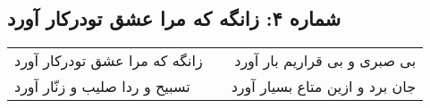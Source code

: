\begin{center}
\section*{شماره ۴: زانگه که مرا عشق تودرکار آورد}
\label{sec:004}
\begin{longtable}{l p{0.5cm} r}
زانگه که مرا عشق تودرکار آورد
&&
بی صبری و بی قراریم بار آورد
\\
تسبیح و ردا صلیب و زنّار آورد
&&
جان برد و ازین متاع بسیار آورد
\\
\end{longtable}
\end{center}
